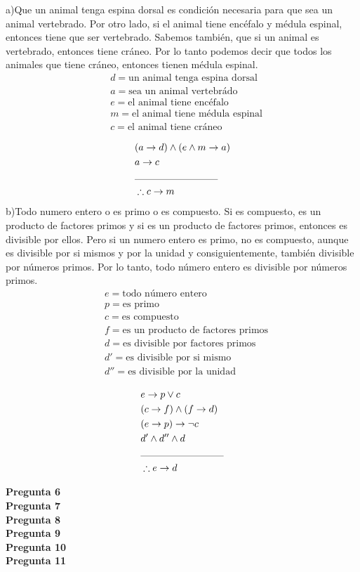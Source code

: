 \documentclass{article}
\begin{document}
a)Que un animal tenga espina dorsal es condición necesaria para que sea un animal vertebrado. Por otro
lado, si el animal tiene encéfalo y médula espinal, entonces tiene que ser vertebrado. Sabemos también,
que si un animal es vertebrado, entonces tiene cráneo. Por lo tanto podemos decir que todos los animales
que tiene cráneo, entonces tienen médula espinal.\\
\begin{align*}
    &d=\text{un animal tenga espina dorsal}\\
    &a=\text{sea un animal vertebrádo}\\
    &e=\text{el animal tiene encéfalo}\\
    &m=\text{el animal tiene médula espinal}\\
    &c=\text{el animal tiene cráneo}\\
\end{align*}
\begin{align*}
    &(a \rightarrow d)\land (e\land m \rightarrow a)\\
    &a\rightarrow c\\
    &\rule{30mm}{0.1mm}\\
    &\therefore c\rightarrow m\\
\end{align*}
b)Todo numero entero o es primo o es compuesto. Si es compuesto, es un producto de factores primos y si
es un producto de factores primos, entonces es divisible por ellos. Pero si un numero entero es primo, no
es compuesto, aunque es divisible por si mismos y por la unidad y consiguientemente, también divisible
por números primos. Por lo tanto, todo número entero es divisible por números primos.\\
\begin{align*}
    &e=\text{todo número entero}\\
    &p=\text{es primo}\\
    &c=\text{es compuesto}\\
    &f=\text{es un producto de factores primos}\\
    &d=\text{es divisible por factores primos}\\
    &d'=\text{es divisible por si mismo}\\
    &d''=\text{es divisible por la unidad}\\
\end{align*}
\begin{align*}
    &e\rightarrow p \lor c\\
    &(c\rightarrow f)\land (f\rightarrow d)\\
    &(e\rightarrow p)\rightarrow \neg c\\
    &d'\land d'' \land d\\
    &\rule{30mm}{0.1mm}\\
    &\therefore e\rightarrow d
\end{align*}



\textbf{\Large Pregunta 6}\\
\textbf{\Large Pregunta 7}\\
\textbf{\Large Pregunta 8}\\
\textbf{\Large Pregunta 9}\\
\textbf{\Large Pregunta 10}\\
\textbf{\Large Pregunta 11}\\
\end{document}
